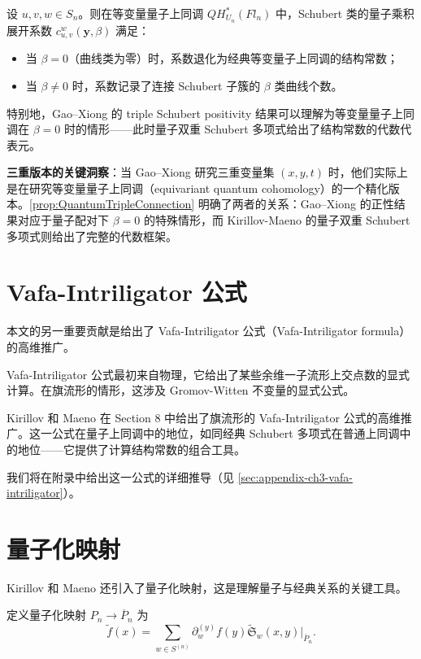 \begin{Proposition}[量子与三重的联系]
\label{prop:QuantumTripleConnection}
设 $u, v, w \in S_n$。则在等变量量子上同调 $QH^*_{U_n}(Fl_n)$ 中，Schubert 类的量子乘积展开系数 $c_{u,v}^{w}(\mathbf{y}, \beta)$ 满足：
\begin{itemize}
\item 当 $\beta = 0$（曲线类为零）时，系数退化为经典等变量子上同调的结构常数；
\item 当 $\beta \neq 0$ 时，系数记录了连接 Schubert 子簇的 $\beta$ 类曲线个数。
\end{itemize}
特别地，Gao--Xiong \cite{GX2025} 的 triple Schubert positivity 结果可以理解为等变量量子上同调在 $\beta = 0$ 时的情形——此时量子双重 Schubert 多项式给出了结构常数的代数代表元。
\end{Proposition}

\textbf{三重版本的关键洞察}：当 Gao--Xiong \cite{GX2025} 研究三重变量集 $(x, y, t)$ 时，他们实际上是在研究等变量量子上同调（equivariant quantum cohomology）的一个精化版本。\cref{prop:QuantumTripleConnection} 明确了两者的关系：Gao--Xiong \cite{GX2025} 的正性结果对应于量子配对下 $\beta = 0$ 的特殊情形，而 Kirillov-Maeno 的量子双重 Schubert 多项式则给出了完整的代数框架。

\section{Vafa-Intriligator 公式}
\label{sec:VafaIntriligator}

本文的另一重要贡献是给出了 Vafa-Intriligator 公式（Vafa-Intriligator formula）的高维推广。

Vafa-Intriligator 公式最初来自物理，它给出了某些余维一子流形上交点数的显式计算。在旗流形的情形，这涉及 Gromov-Witten 不变量的显式公式。

Kirillov 和 Maeno 在 Section 8 中给出了旗流形的 Vafa-Intriligator 公式的高维推广。这一公式在量子上同调中的地位，如同经典 Schubert 多项式在普通上同调中的地位——它提供了计算结构常数的组合工具。

我们将在附录中给出这一公式的详细推导（见 \cref{sec:appendix-ch3-vafa-intriligator}）。

\section{量子化映射}
\label{sec:QuantizationMap}

Kirillov 和 Maeno 还引入了量子化映射，这是理解量子与经典关系的关键工具。

定义量子化映射 $P_n \to \overline{P}_n$ 为
\[
\widetilde{f}(x) = \sum_{w \in S^{(n)}} \partial_w^{(y)} f(y) \widetilde{\mathfrak{S}}_w(x,y) \big|_{\overline{P}_n}.
\label{eq:QuantizationMap}
\]

